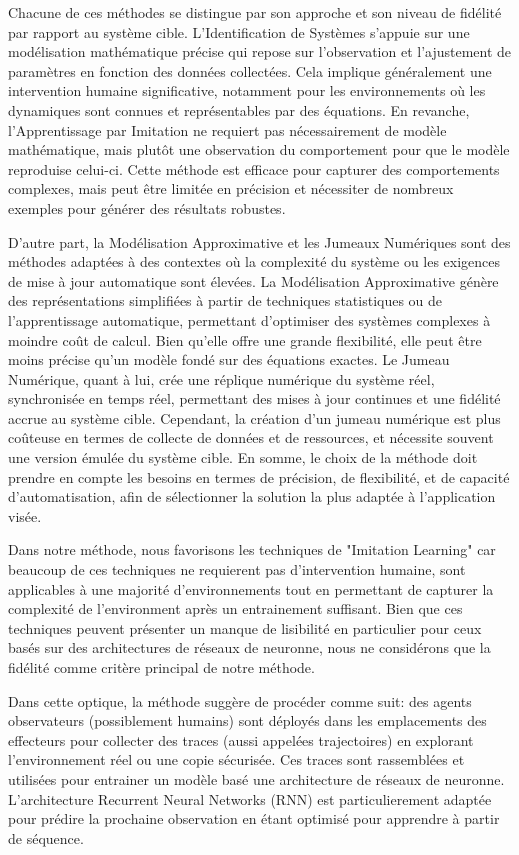 \documentclass[sigconf,anonymous]{aamas}
\begin{document}
Chacune de ces méthodes se distingue par son approche et son niveau de fidélité par rapport au système cible. L'Identification de Systèmes s'appuie sur une modélisation mathématique précise qui repose sur l'observation et l'ajustement de paramètres en fonction des données collectées. Cela implique généralement une intervention humaine significative, notamment pour les environnements où les dynamiques sont connues et représentables par des équations. En revanche, l'Apprentissage par Imitation ne requiert pas nécessairement de modèle mathématique, mais plutôt une observation du comportement pour que le modèle reproduise celui-ci. Cette méthode est efficace pour capturer des comportements complexes, mais peut être limitée en précision et nécessiter de nombreux exemples pour générer des résultats robustes.

D'autre part, la Modélisation Approximative et les Jumeaux Numériques sont des méthodes adaptées à des contextes où la complexité du système ou les exigences de mise à jour automatique sont élevées. La Modélisation Approximative génère des représentations simplifiées à partir de techniques statistiques ou de l'apprentissage automatique, permettant d'optimiser des systèmes complexes à moindre coût de calcul. Bien qu'elle offre une grande flexibilité, elle peut être moins précise qu'un modèle fondé sur des équations exactes. Le Jumeau Numérique, quant à lui, crée une réplique numérique du système réel, synchronisée en temps réel, permettant des mises à jour continues et une fidélité accrue au système cible. Cependant, la création d'un jumeau numérique est plus coûteuse en termes de collecte de données et de ressources, et nécessite souvent une version émulée du système cible. En somme, le choix de la méthode doit prendre en compte les besoins en termes de précision, de flexibilité, et de capacité d'automatisation, afin de sélectionner la solution la plus adaptée à l'application visée.

Dans notre méthode, nous favorisons les techniques de "Imitation Learning" car beaucoup de ces techniques ne requierent pas d'intervention humaine, sont applicables à une majorité d'environnements tout en permettant de capturer la complexité de l'environment après un entrainement suffisant. Bien que ces techniques peuvent présenter un manque de lisibilité en particulier pour ceux basés sur des architectures de réseaux de neuronne, nous ne considérons que la fidélité comme critère principal de notre méthode.

Dans cette optique, la méthode suggère de procéder comme suit: des agents observateurs (possiblement humains) sont déployés dans les emplacements des effecteurs pour collecter des traces (aussi appelées trajectoires) en explorant l'environnement réel ou une copie sécurisée. Ces traces sont rassemblées et utilisées pour entrainer un modèle basé une architecture de réseaux de neuronne. L'architecture Recurrent Neural Networks (RNN) est particulierement adaptée pour prédire la prochaine observation en étant optimisé pour apprendre à partir de séquence.
\end{document}
